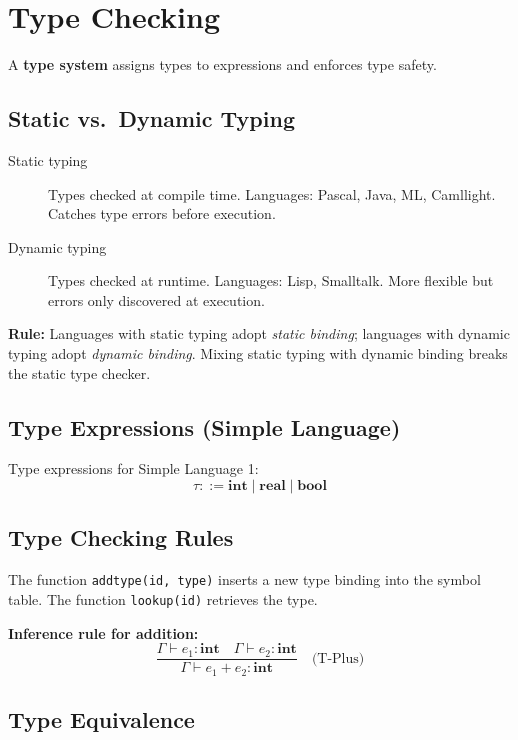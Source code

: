 \documentclass[12pt,a4paper]{article}
\begin{document}
\section{Type Checking}

A \textbf{type system} assigns types to expressions and enforces type safety.

\subsection{Static vs.\ Dynamic Typing}

\begin{description}
  \item[Static typing] Types checked at compile time.
        Languages: Pascal, Java, ML, Camllight.
        Catches type errors before execution.
  \item[Dynamic typing] Types checked at runtime.
        Languages: Lisp, Smalltalk.
        More flexible but errors only discovered at execution.
\end{description}

\textbf{Rule:} Languages with static typing adopt \emph{static binding};
languages with dynamic typing adopt \emph{dynamic binding}.
Mixing static typing with dynamic binding breaks the static type checker.

\subsection{Type Expressions (Simple Language)}

Type expressions for Simple Language 1:
\[
\tau ::= \mathbf{int} \mid \mathbf{real} \mid \mathbf{bool}
\]

\subsection{Type Checking Rules}

The function \texttt{addtype(id, type)} inserts a new type binding into the symbol table.
The function \texttt{lookup(id)} retrieves the type.

\textbf{Inference rule for addition:}
\[
\frac{\Gamma \vdash e_1 : \mathbf{int} \quad \Gamma \vdash e_2 : \mathbf{int}}
     {\Gamma \vdash e_1 + e_2 : \mathbf{int}}
     \quad\text{(T-Plus)}
\]

\subsection{Type Equivalence}
\end{document}
